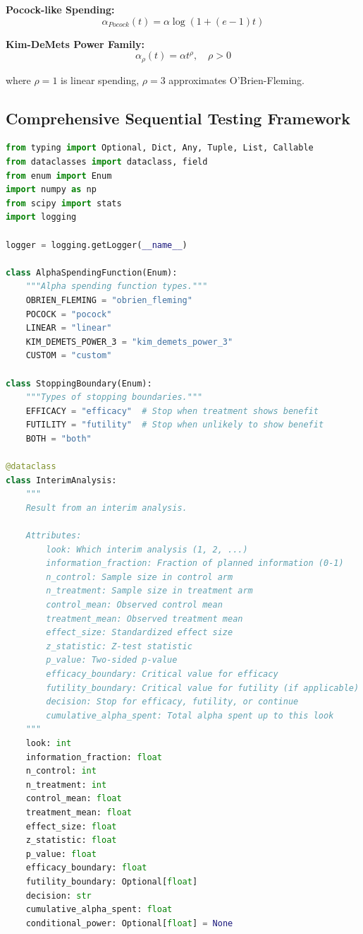 \textbf{Pocock-like Spending:}
\begin{equation}
\alpha_{Pocock}(t) = \alpha \log(1 + (e - 1)t)
\end{equation}

\textbf{Kim-DeMets Power Family:}
\begin{equation}
\alpha_\rho(t) = \alpha t^\rho, \quad \rho > 0
\end{equation}

where $\rho = 1$ is linear spending, $\rho = 3$ approximates O'Brien-Fleming.

\subsection{Comprehensive Sequential Testing Framework}

\begin{lstlisting}[language=Python, caption={Comprehensive Sequential Testing Framework}]
from typing import Optional, Dict, Any, Tuple, List, Callable
from dataclasses import dataclass, field
from enum import Enum
import numpy as np
from scipy import stats
import logging

logger = logging.getLogger(__name__)

class AlphaSpendingFunction(Enum):
    """Alpha spending function types."""
    OBRIEN_FLEMING = "obrien_fleming"
    POCOCK = "pocock"
    LINEAR = "linear"
    KIM_DEMETS_POWER_3 = "kim_demets_power_3"
    CUSTOM = "custom"

class StoppingBoundary(Enum):
    """Types of stopping boundaries."""
    EFFICACY = "efficacy"  # Stop when treatment shows benefit
    FUTILITY = "futility"  # Stop when unlikely to show benefit
    BOTH = "both"

@dataclass
class InterimAnalysis:
    """
    Result from an interim analysis.

    Attributes:
        look: Which interim analysis (1, 2, ...)
        information_fraction: Fraction of planned information (0-1)
        n_control: Sample size in control arm
        n_treatment: Sample size in treatment arm
        control_mean: Observed control mean
        treatment_mean: Observed treatment mean
        effect_size: Standardized effect size
        z_statistic: Z-test statistic
        p_value: Two-sided p-value
        efficacy_boundary: Critical value for efficacy
        futility_boundary: Critical value for futility (if applicable)
        decision: Stop for efficacy, futility, or continue
        cumulative_alpha_spent: Total alpha spent up to this look
    """
    look: int
    information_fraction: float
    n_control: int
    n_treatment: int
    control_mean: float
    treatment_mean: float
    effect_size: float
    z_statistic: float
    p_value: float
    efficacy_boundary: float
    futility_boundary: Optional[float]
    decision: str
    cumulative_alpha_spent: float
    conditional_power: Optional[float] = None


\end{lstlisting}
